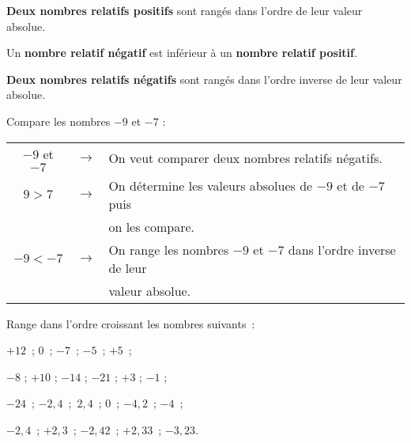 \newpage

\begin{aconnaitre}
\textbf{Deux nombres relatifs positifs} sont rangés dans l'ordre de leur valeur absolue.

Un \textbf{nombre relatif négatif} est inférieur à un \textbf{nombre relatif positif}.

\textbf{Deux nombres relatifs négatifs} sont rangés dans l'ordre inverse de leur valeur absolue.
\end{aconnaitre}

\vspace{4em}


\begin{methode*1}

\begin{exemple*1}
Compare les nombres $-9$ et $-7$ : \\[0.5em]
\begin{tabular}{ccl} 
 $-9$ et $-7$ & $\longrightarrow$ & On veut comparer deux nombres relatifs négatifs. \\
 $9 > 7$ & $\longrightarrow$ & On détermine les valeurs absolues de $-9$ et de $-7$ puis  \\
& & on les compare. \\
 $-9 < -7$ & $\longrightarrow$ & On range les nombres $-9$ et $-7$ dans l'ordre inverse de leur  \\
 & & valeur absolue. \\
 \end{tabular}
\end{exemple*1}


\exercice
Range dans l'ordre croissant les nombres suivants : 
\begin{colenumerate}{2}
 \item $+12$ ; 0 ; $-7$ ; $-5$ ; $+5$ ;
 \item $-8$ ; $+10$ ; $-14$ ; $-21$ ; $+3$ ; $-1$ ;
 \item $-24$ ; $-2,4$ ; $2,4$ ; 0 ; $-4,2$ ; $-4$ ;
 \item $-2,4$ ; $+2,3$ ; $-2,42$ ; $+2,33$ ; $-3,23$.
 \end{colenumerate}

\end{methode*1}

